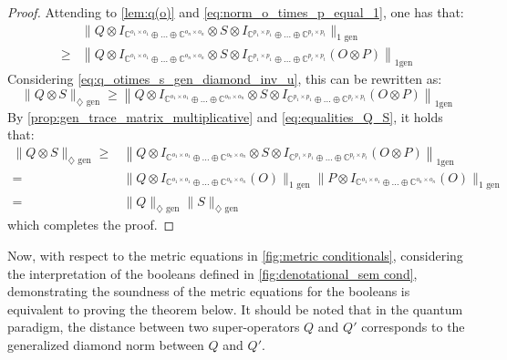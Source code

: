 \begin{proof}
 Attending to \autoref{lem:q(o)} and  \autoref{eq:norm_o_times_p_equal_1}, one has that:
\begin{equation}
  \begin{split}
  & \lVert Q \otimes  I_{\mathbb{C}^{o_1 \times o_1} \oplus \ldots \oplus \mathbb{C}^{o_n \times o_n}} \otimes S \otimes  I_{\mathbb{C}^{p_1 \times p_1} \oplus \ldots \oplus \mathbb{C}^{p_t \times p_t}} \rVert_{1\text{ gen}}   \\
  \geq & \left\lVert Q \otimes  I_{\mathbb{C}^{o_1 \times o_1} \oplus \ldots \oplus \mathbb{C}^{o_n \times o_n}} \otimes S \otimes  I_{\mathbb{C}^{p_1 \times p_1} \oplus \ldots \oplus \mathbb{C}^{p_t \times p_t}} (O \otimes P) \right\rVert_{1 \text{gen}}
  \end{split}
\end{equation}
Considering \autoref{eq:q_otimes_s_gen_diamond_inv_u}, this can be rewritten as:
\begin{equation}
  \lVert Q \otimes S \rVert_{\diamondsuit \text{ gen}} \geq   \left\lVert Q \otimes  I_{\mathbb{C}^{o_1 \times o_1} \oplus \ldots \oplus \mathbb{C}^{o_n \times o_n}} \otimes S \otimes  I_{\mathbb{C}^{p_1 \times p_1} \oplus \ldots \oplus \mathbb{C}^{p_t \times p_t}} (O \otimes P) \right\rVert_{1 \text{gen}}
\end{equation}
By \autoref{prop:gen_trace_matrix_multiplicative} and \autoref{eq:equalities_Q_S}, it holds that:
\begin{equation}
  \begin{split}
    \lVert Q \otimes S \rVert_{\diamondsuit \text{ gen}} \geq & \left\lVert Q \otimes  I_{\mathbb{C}^{o_1 \times o_1} \oplus \ldots \oplus \mathbb{C}^{o_n \times o_n}} \otimes S \otimes  I_{\mathbb{C}^{p_1 \times p_1} \oplus \ldots \oplus \mathbb{C}^{p_t \times p_t}} (O \otimes P) \right\rVert_{1 \text{gen}} \\
   = & \lVert Q \otimes I_{\mathbb{C}^{o_1 \times o_1} \oplus \ldots \oplus \mathbb{C}^{o_n \times o_n}}  (O) \rVert_{1 \text{ gen}}  \lVert P \otimes I_{\mathbb{C}^{o_1 \times o_1} \oplus \ldots \oplus \mathbb{C}^{o_n \times o_n}}  (O) \rVert_{1 \text{ gen}} \\
   = & \lVert Q  \rVert_{\diamondsuit \text{ gen}} \lVert S  \rVert_{\diamondsuit \text{ gen}} 
  \end{split}
\end{equation}
which completes the proof.
\end{proof}


Now, with respect to the metric equations in \autoref{fig:metric conditionals}, considering the interpretation of the booleans defined in \autoref{fig:denotational_sem cond}, demonstrating the soundness of the metric equations for the booleans is equivalent to proving the theorem below. It should be noted that in the quantum paradigm, the distance between two super-operators $Q$ and $Q'$ corresponds to the generalized diamond norm between $Q$ and $Q'$.

